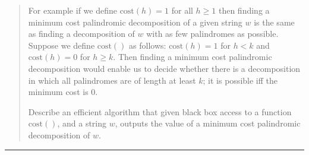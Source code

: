 \documentclass[11pt]{article}
\newcommand{\cost}{\text{cost}}
\begin{document}
\begin{quote}
For example if we define $\cost(h) = 1$ for all $h \ge 1$ then finding
a minimum cost palindromic decomposition of a given string $w$ is the
same as finding a decomposition of $w$ with as few palindromes as
possible. Suppose we define $\cost()$ as follows: $\cost(h) = 1$
for $h < k$ and $\cost(h) = 0$ for $h \ge k$. Then finding a
minimum cost palindromic decomposition would enable us to decide
whether there is a decomposition in which all palindromes are
of length at least $k$; it is possible iff the minimum cost is $0$.

Describe an efficient algorithm that given  black box access to
a function $\cost()$, and a string $w$, outputs the
value of a minimum cost palindromic decomposition of $w$.
\end{quote}
\hrule
\end{document}
